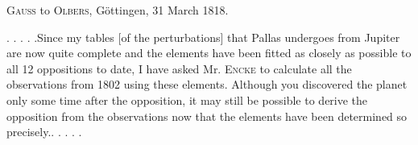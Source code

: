 \par{}\bigskip
\begin{center}
\textsc{Gauss} to \textsc{Olbers}, Göttingen, 31 March 1818.
\end{center}
\noindent\hspace*{\parindent}. . . . .\quad Since my tables [of the perturbations] that Pallas undergoes from Jupiter are now quite complete and the elements have been fitted as closely as possible to all 12 oppositions to date, I have asked Mr. \textsc{Encke} to calculate all the observations from 1802 using these elements. Although you discovered the planet only some time after the opposition, it may still be possible to derive the opposition from the observations now that the elements have been determined so precisely.\quad . . . . .
\par
